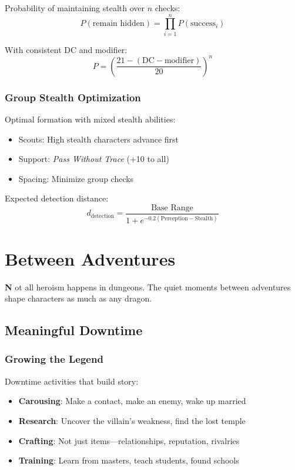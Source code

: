 \documentclass[11pt,letterpaper,openany]{book}
\newcommand{\firstletter}[1]{%
    \textcolor{bloodred}{\fontsize{48}{48}\selectfont\bfseries #1}%
}
\newcommand{\spell}[1]{\textcolor{mysticblue}{\textit{#1}}}
\begin{document}
Probability of maintaining stealth over $n$ checks:
\begin{equation}
P(\text{remain hidden}) = \prod_{i=1}^{n} P(\text{success}_i)
\end{equation}

With consistent DC and modifier:
\begin{equation}
P = \left(\frac{21 - (\text{DC} - \text{modifier})}{20}\right)^n
\end{equation}

\subsection{Group Stealth Optimization}

Optimal formation with mixed stealth abilities:
\begin{itemize}
    \item Scouts: High stealth characters advance first
    \item Support: \spell{Pass Without Trace} (+10 to all)
    \item Spacing: Minimize group checks
\end{itemize}

Expected detection distance:
\begin{equation}
d_{\text{detection}} = \frac{\text{Base Range}}{1 + e^{-0.2(\text{Perception} - \text{Stealth})}}
\end{equation}

\chapter{Between Adventures}

\firstletter{N}ot all heroism happens in dungeons. The quiet moments between adventures shape characters as much as any dragon.

\section{Meaningful Downtime}

\subsection{Growing the Legend}

Downtime activities that build story:
\begin{itemize}
    \item \textbf{Carousing}: Make a contact, make an enemy, wake up married
    \item \textbf{Research}: Uncover the villain's weakness, find the lost temple
    \item \textbf{Crafting}: Not just items—relationships, reputation, rivalries
    \item \textbf{Training}: Learn from masters, teach students, found schools
\end{itemize}
\end{document}
